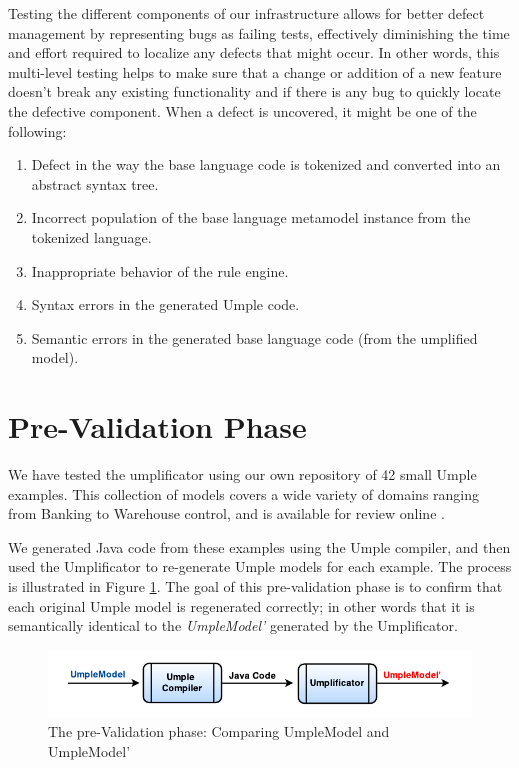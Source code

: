 Testing the different components of our infrastructure allows for better defect management by representing bugs as failing tests, effectively diminishing the time and effort required to localize any defects that might occur. In other words, this multi-level testing helps to make sure that a change or addition of a new feature doesn't break any existing functionality and if there is any bug to quickly locate the defective component. When a defect is uncovered, it might be one of the following:

\begin{enumerate}
\item Defect in the way the base language code is tokenized and converted into an abstract syntax tree.

\item Incorrect population of the base language metamodel instance from the tokenized language.

\item Inappropriate behavior of the rule engine.

\item Syntax errors in the generated Umple code.

\item Semantic errors in the generated base language code (from the umplified model).
\end{enumerate}

\section{Pre-Validation Phase}

We have tested the umplificator using our own repository of 42 small Umple examples. This collection of models covers a wide variety of domains ranging from Banking to Warehouse control, and is available for review online \cite{umpleexamples}.

We generated Java code from these examples using the Umple compiler, and then used the Umplificator to re-generate Umple models for each example. The process is illustrated in Figure \ref{fig:preValidation}. The goal of this pre-validation phase is to confirm that each original Umple model is regenerated correctly; in other words that it is semantically identical to the \textit{UmpleModel'}  generated by the Umplificator.
 
\begin{figure}[h]
\centering
\includegraphics{Figures/preValidation.pdf} 
\caption{The pre-Validation phase: Comparing UmpleModel and UmpleModel'}
\label{fig:preValidation}
\end{figure}

